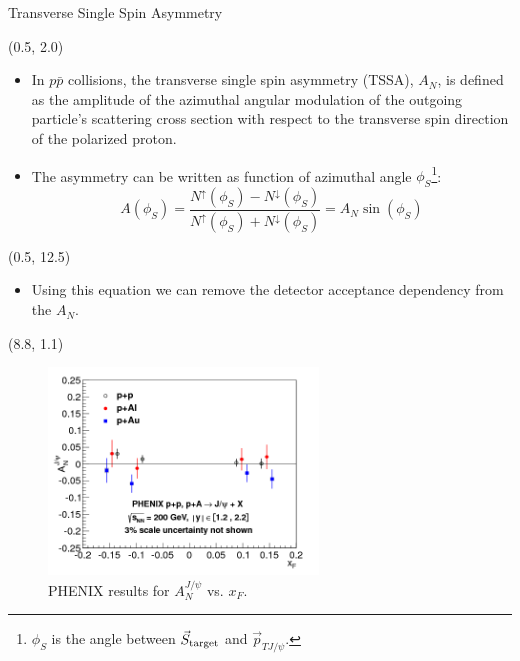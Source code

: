 \documentclass[10pt, xcolor={dvipsnames}, aspectratio = 169]{beamer}
\newcommand{\citeme}[1]{{\tiny \footfullcite{#1}}}
\newcommand{\pp}{$p\bar{p}$ }
\begin{document}
\begin{frame}{Transverse Single Spin Asymmetry}

\begin{textblock}{8.0}(0.5, 2.0)

\begin{itemize}

\item In \pp collisions, the transverse single spin asymmetry (TSSA), $A_{N}$, is defined as the amplitude of the azimuthal angular modulation of the outgoing particle’s scattering cross section with respect to the transverse spin direction of the polarized proton.

\item The asymmetry can be written as function of azimuthal angle $\phi_{S}$\footnote{\tiny {$\phi_{S}$ is the angle between $\vec{S}_{\rm target}$ and $\vec{p}_{TJ/\psi}$}.}:
%
\begin{equation*}
    A(\phi_{S}) = \frac{N^{\uparrow}(\phi_{S}) - N^{\downarrow}(\phi_{S})}{N^{\uparrow}(\phi_{S}) + N^{\downarrow}(\phi_{S})} = A_{N}\sin(\phi_{S})
\end{equation*}
%
%
\end{itemize}
\end{textblock}

\begin{textblock}{15.0}(0.5, 12.5)
\begin{itemize}
\item Using this equation we can remove the detector acceptance dependency from the $A_{N}$.
\end{itemize}
\end{textblock}


\begin{textblock}{7.0}(8.8, 1.1)

\begin{figure}
    \centering
    \includegraphics[height = 5.5cm]{imgs/final_xf.png}
    \caption{PHENIX results for $A^{J/\psi}_{N}$ vs. $x_{F}$. \citeme{PHENIX:2018qvl}}
\end{figure}

\end{textblock}

\end{frame}
\end{document}
